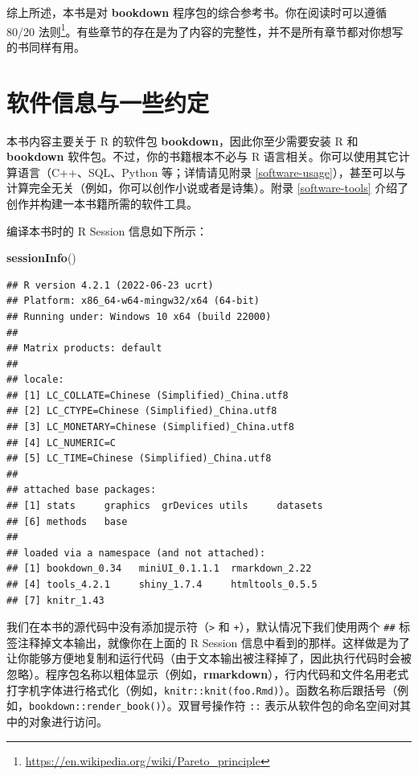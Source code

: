 \documentclass[
  12pt,
]{krantz}
\newenvironment{Shaded}{\begin{snugshade}}{\end{snugshade}}
\newcommand{\FunctionTok}[1]{\textcolor[rgb]{0.13,0.29,0.53}{\textbf{#1}}}
\newcommand{\NormalTok}[1]{#1}
\renewcommand{\href}[2]{#2\footnote{\url{#1}}}
\theoremstyle{definition}
\theoremstyle{definition}
\theoremstyle{definition}
\theoremstyle{definition}
\theoremstyle{remark}
\begin{document}
综上所述，本书是对 \textbf{bookdown} 程序包的综合参考书。你在阅读时可以遵循 \href{https://en.wikipedia.org/wiki/Pareto_principle}{80/20 法则}。有些章节的存在是为了内容的完整性，并不是所有章节都对你想写的书同样有用。

\hypertarget{ux8f6fux4ef6ux4fe1ux606fux4e0eux4e00ux4e9bux7ea6ux5b9a}{%
\section*{软件信息与一些约定}\label{ux8f6fux4ef6ux4fe1ux606fux4e0eux4e00ux4e9bux7ea6ux5b9a}}


本书内容主要关于 R 的软件包 \textbf{bookdown}，因此你至少需要安装 R 和 \textbf{bookdown} 软件包。不过，你的书籍根本不必与 R 语言相关。你可以使用其它计算语言（C++、SQL、Python 等；详情请见附录 \ref{software-usage}），甚至可以与计算完全无关（例如，你可以创作小说或者是诗集）。附录 \ref{software-tools} 介绍了创作并构建一本书籍所需的软件工具。

编译本书时的 R Session 信息如下所示：

\begin{Shaded}
\begin{Highlighting}[]
\FunctionTok{sessionInfo}\NormalTok{()}
\end{Highlighting}
\end{Shaded}

\begin{verbatim}
## R version 4.2.1 (2022-06-23 ucrt)
## Platform: x86_64-w64-mingw32/x64 (64-bit)
## Running under: Windows 10 x64 (build 22000)
## 
## Matrix products: default
## 
## locale:
## [1] LC_COLLATE=Chinese (Simplified)_China.utf8 
## [2] LC_CTYPE=Chinese (Simplified)_China.utf8   
## [3] LC_MONETARY=Chinese (Simplified)_China.utf8
## [4] LC_NUMERIC=C                               
## [5] LC_TIME=Chinese (Simplified)_China.utf8    
## 
## attached base packages:
## [1] stats     graphics  grDevices utils     datasets 
## [6] methods   base     
## 
## loaded via a namespace (and not attached):
## [1] bookdown_0.34   miniUI_0.1.1.1  rmarkdown_2.22 
## [4] tools_4.2.1     shiny_1.7.4     htmltools_0.5.5
## [7] knitr_1.43
\end{verbatim}

我们在本书的源代码中没有添加提示符（\texttt{\textgreater{}} 和 \texttt{+}），默认情况下我们使用两个 \texttt{\#\#} 标签注释掉文本输出，就像你在上面的 R Session 信息中看到的那样。这样做是为了让你能够方便地复制和运行代码（由于文本输出被注释掉了，因此执行代码时会被忽略）。程序包名称以粗体显示（例如，\textbf{rmarkdown}），行内代码和文件名用老式打字机字体进行格式化（例如，\texttt{knitr::knit(\textquotesingle{}foo.Rmd\textquotesingle{})}）。函数名称后跟括号（例如，\texttt{bookdown::render\_book()}）。双冒号操作符 \texttt{::} 表示从软件包的命名空间对其中的对象进行访问。
\end{document}
